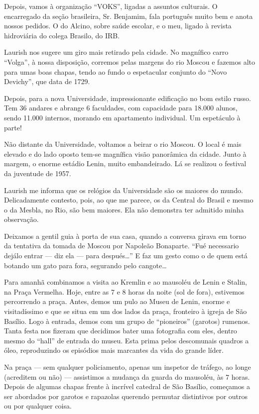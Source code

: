 Depois, vamos à organização ``VOKS'', ligadas a assuntos culturais. O encarregado da seção brasileira, Sr. Benjamim, fala português muito bem e anota nossos pedidos. O do Alcino, sobre saúde escolar, e o meu, ligado à revista hidroviária do colega Brasilo, do IRB.

Laurish nos sugere um giro mais retirado pela cidade. No magnífico carro ``Volga'', à nossa disposição, corremos pelas margens do rio Moscou e fazemos alto para umas boas chapas, tendo ao fundo o espetacular conjunto do ``Novo Devichy'', que data de 1729.

Depois, para a nova Universidade, impressionante edificação no bom estilo russo. Tem 36 andares e abrange 6 faculdades, com capacidade para 18.000 alunos, sendo 11.000 internos, morando em apartamento individual. Um espetáculo à parte!

Não distante da Universidade, voltamos a beirar o rio Moscou. O local é mais elevado e do lado oposto tem-se magnífica visão panorâmica da cidade. Junto à margem, o enorme estádio Lenin, muito embandeirado. Lá se realizou o festival da juventude de 1957.

Laurish me informa que os relógios da Universidade são os maiores do mundo. Delicadamente contesto, pois, ao que me parece, os da Central do Brasil e mesmo o da Mesbla, no Rio, são bem maiores. Ela não demonstra ter admitido minha observação.

Deixamos a gentil guia à porta de sua casa, quando a conversa girava em torno da tentativa da tomada de Moscou por Napoleão Bonaparte. ``Fué necessario dejálo entrar --- diz ela --- para después\ldots'' E faz um gesto como o de quem está botando um gato para fora, segurando pelo cangote\ldots

Para amanhã combinamos a visita ao Kremlin e ao mausoléu de Lenin e Stalin, na Praça Vermelha. Hoje, entre as 7 e 8 horas da noite (sol de fora), estivemos percorrendo a praça. Antes, demos um pulo ao Museu de Lenin, enorme e visitadíssimo e que se situa em um dos lados da praça, fronteiro à igreja de São Basílio. Logo à entrada, demos com um grupo de ``pioneiros'' (garotos) rumenos. Tanta festa nos fizeram que decidimos bater uma fotografia com eles, dentro mesmo do ``hall'' de entrada do museu. Esta prima pelos descomunais quadros a óleo, reproduzindo os episódios mais marcantes da vida do grande líder.

Na praça --- sem qualquer policiamento, apenas um inspetor de tráfego, ao longe (acreditem ou não) --- assistimos a mudança da guarda do mausoléu, às 7 horas. Depois de algumas chapas frente à incrível catedral de São Basílio, começamos a ser abordados por garotos e rapazolas querendo permutar distintivos por outros ou por qualquer coisa.

